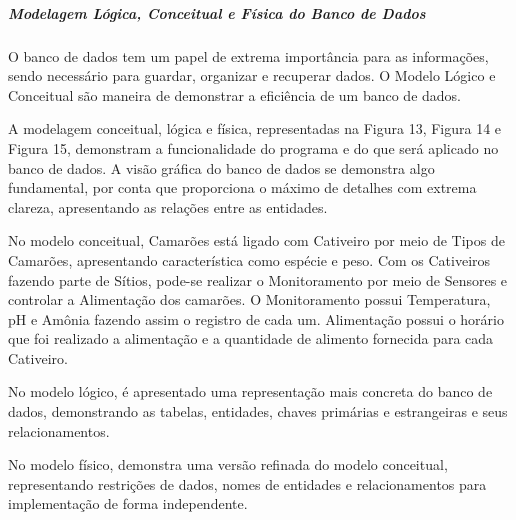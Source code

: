 \newpage


\subparagraph*{\textbf{Modelagem Lógica, Conceitual e Física do Banco de Dados}}

O banco de dados tem um papel de extrema importância para as informações, sendo necessário para guardar, organizar e recuperar dados. O Modelo Lógico e Conceitual são maneira de demonstrar a eficiência de um banco de dados.

A modelagem conceitual, lógica e física, representadas na Figura 13, Figura 14 e Figura 15, demonstram a funcionalidade do programa e do que será aplicado no banco de dados. A visão gráfica do banco de dados se demonstra algo fundamental, por conta que proporciona o máximo de detalhes com extrema clareza, apresentando as relações entre as entidades.

No modelo conceitual, Camarões está ligado com Cativeiro por meio de Tipos de Camarões, apresentando característica como espécie e peso. Com os Cativeiros fazendo parte de Sítios, pode-se realizar o Monitoramento por meio de Sensores e controlar a Alimentação dos camarões. O Monitoramento possui Temperatura, pH e Amônia fazendo assim o registro de cada um. Alimentação possui o horário que foi realizado a alimentação e a quantidade de alimento fornecida para cada Cativeiro.

No modelo lógico, é apresentado uma representação mais concreta do banco de dados, demonstrando as tabelas, entidades, chaves primárias e estrangeiras e seus relacionamentos.

No modelo físico, demonstra uma versão refinada do modelo conceitual, representando restrições de dados, nomes de entidades e relacionamentos para implementação de forma independente.

    \newpage

